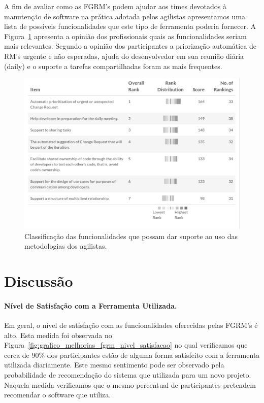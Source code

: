 A fim de avaliar como as FGRM's podem ajudar aos times devotados à manutenção de
software na prática adotada pelos agilistas apresentamos uma lista de possíveis
funcionalidades que este tipo de ferramenta poderia fornecer. A
Figura~\ref{fig:grafico_melhorias_fgrm_suporte_particas_ageis} apresenta a
opinião dos profissionais quais as funcionalidades seriam mais relevantes.
Segundo a opinião dos participantes a priorização automática de RM's urgente e
não esperadas, ajuda do desenvolvedor em sua reunião diária (daily) e o suporte
a tarefas compartilhadas foram as mais frequentes. 

\begin{figure}[htpb]
	\centering
	\includegraphics[width=0.8\linewidth]{./chapter-pesquisa-com-profissionais/img/grafico_melhorias_fgrm_suporte_particas_ageis.pdf}
	\caption{Classificação das funcionalidades que possam dar suporte ao uso das
	metodologias dos agilistas.}
	\label{fig:grafico_melhorias_fgrm_suporte_particas_ageis}
\end{figure}

\section{Discussão}

\paragraph{Nível de Satisfação com a Ferramenta Utilizada.}
\label{par:pesq_profissionais_nivel_de_satisfação}

Em geral, o nível de satisfação com as funcionalidades oferecidas pelas FGRM's é
alto. Esta medida foi observada no
Figura~\ref{fig:grafico_melhorias_fgrm_nivel_satisfacao} no qual verificamos que
cerca de 90\% dos participantes estão de alguma forma satisfeito com a
ferramenta utilizada diariamente. Este mesmo sentimento pode ser observado pela
probabilidade de recomendação do sistema que utilizada para um novo projeto.
Naquela medida verificamos que o mesmo percentual de participantes pretendem
recomendar o software que utiliza.


